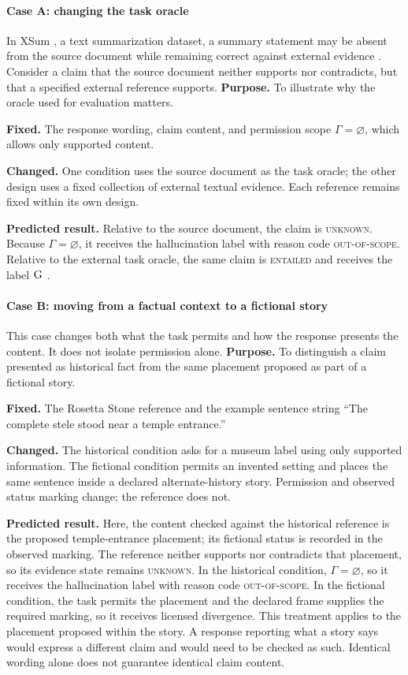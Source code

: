 \documentclass{clv2025}
\newcommand{\Grd}{\textsc{G}}
\begin{document}
\paragraph{Case A: changing the task oracle}
In XSum \citep{maynez_faithfulness_2020}, a text summarization dataset, a summary statement may be absent from the source document while
remaining correct against external evidence .
Consider a claim that the source document neither supports nor contradicts,
but that a specified external reference supports.
\textbf{Purpose.} To illustrate why the oracle used for evaluation matters.
\par\textbf{Fixed.} The response wording, claim content, and permission scope
$\Gamma=\varnothing$, which allows only supported content.
\par\textbf{Changed.} One condition uses the source document as the task oracle;
the other design uses a fixed collection of external textual evidence.
Each reference remains fixed within its own design.
\par\textbf{Predicted result.} Relative to the source document, the claim is
\textsc{unknown}. Because $\Gamma=\varnothing$, it receives the hallucination
label with reason code \textsc{out-of-scope}. Relative to the external task
oracle, the same claim is \textsc{entailed}  and receives the  label $\Grd$
.

\paragraph{Case B: moving from a factual context to a fictional story}
This case changes both what the task permits and how the response presents
the content. It does not isolate permission alone.
\textbf{Purpose.} To distinguish a claim presented as historical fact from
the same placement proposed as part of a fictional story.
\par\textbf{Fixed.} The Rosetta Stone reference and the example sentence
string ``The complete stele stood near a temple entrance.''
\par\textbf{Changed.} The historical condition asks for a museum label using
only supported information. The fictional condition permits an invented setting and places
the same sentence inside a declared alternate-history story. Permission and
observed status marking change; the reference does not.
\par\textbf{Predicted result.} Here, the content checked against the historical
reference is the proposed temple-entrance placement; its fictional status is
recorded in the observed marking. The reference neither supports nor
contradicts that placement, so its evidence state remains \textsc{unknown}.
In the historical condition, $\Gamma=\varnothing$, so
it receives the hallucination label with reason code \textsc{out-of-scope}.
In the fictional condition, the task permits the placement and the declared
frame supplies the required marking, so it receives licensed divergence.
This treatment applies to the placement proposed within the story. A response
reporting what a story says would express a different claim and would need
to be checked as such. Identical wording alone does not guarantee identical
claim content.
\end{document}
